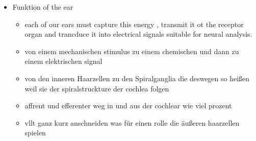 \documentclass[12pt,a4paper,pdftex]{article}
\begin{document}
\begin{itemize}
    \item Funktion of the ear
    \begin{itemize}
        \item each of our ears must capture this energy , transmit it ot the receptor organ and trancduce it into electrical signals suitable for neural analysis. \cite{kandel2013principles}
        \item von einem mechanischen stimulus zu einem chemischen und dann zu einem elektrischen signal
        \item von den inneren Haarzellen zu den Spiralganglia die deswegen so heißen weil sie der spiralstruckture der cochlea folgen \cite{kandel2013principles}
        \item affrent und efferenter weg in und aus der cochlear wie viel prozent 
        \item vllt ganz kurz anschneiden was für einen rolle die äußeren haarzellen spielen
        

\end{itemize}
\end{itemize}
\end{document}
